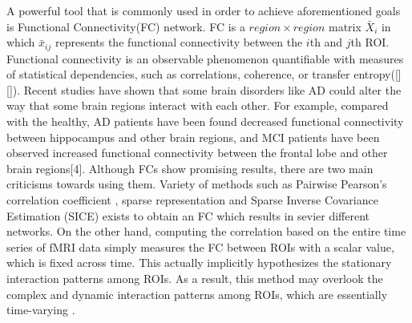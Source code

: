 \documentclass[journal]{IEEEtran}
\begin{document}
   



A powerful tool that is commonly used in order to achieve aforementioned goals is Functional Connectivity(FC) network.  FC is a $region \times region$ matrix $\bar{X}_i$ in which $\bar{x}_{ij}$ represents the functional connectivity between the $i$th and $j$th ROI. Functional connectivity is an observable
phenomenon quantifiable with measures of statistical dependencies, such as correlations, coherence, or transfer entropy([][]).  Recent studies have shown that some brain disorders like AD could alter the way that some brain regions interact with each other. For example, compared with the healthy, AD patients have been found decreased functional connectivity between hippocampus and other brain regions, and MCI patients have been observed increased functional connectivity between the frontal lobe and other brain regions[4]. 
Although FCs show promising results, there are two main criticisms towards using them. Variety of methods such as Pairwise Pearson’s correlation coefficient \cite{r10, r11}, sparse representation \cite{r10, r12, r13}  and Sparse Inverse Covariance Estimation (SICE) exists to obtain an FC which results in sevier different networks. On the other hand, computing the correlation based on the entire time series of fMRI data simply measures the FC between ROIs with a scalar value, which is fixed across time. This actually implicitly hypothesizes the stationary interaction patterns among ROIs. As a result, this method may overlook the complex and dynamic interaction patterns among ROIs, which are essentially time-varying \cite{r16}\textendash \cite{r19}. 
\end{document}
